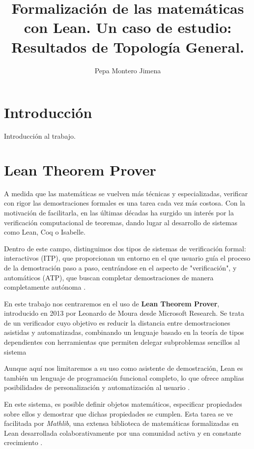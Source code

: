 \documentclass{article}
\title{Formalización de las matemáticas con Lean. Un caso de estudio: Resultados de Topología General.}
\author{Pepa Montero Jimena}
\date{}
\begin{document}
\maketitle
\tableofcontents


\section{Introducción}

Introducción al trabajo.



\newpage

\section{Lean Theorem Prover}

A medida que las matemáticas se vuelven más técnicas y especializadas, verificar con rigor las demostraciones formales es una tarea cada vez más costosa. Con la motivación de facilitarla, en las últimas décadas ha surgido un interés por la verificación computacional de teoremas, dando lugar al desarrollo de sistemas como Lean, Coq o Isabelle.

Dentro de este campo, distinguimos dos tipos de sistemas de verificación formal: interactivos (ITP), que proporcionan un entorno en el que usuario guía el proceso de la demostración paso a paso, centrándose en el aspecto de "verificación", y automáticos (ATP), que buscan completar demostraciones de manera completamente autónoma \cite[Sección~1]{avigad2024theorem}.

En este trabajo nos centraremos en el uso de \textbf{Lean Theorem Prover}, introducido en 2013 por Leonardo de Moura desde Microsoft Research. Se trata de un verificador cuyo objetivo es reducir la distancia entre demostraciones asistidas y automatizadas, combinando un lenguaje basado en la teoría de tipos dependientes con herramientas que permiten delegar subproblemas sencillos al sistema

Aunque aquí nos limitaremos a su uso como asistente de demostración, Lean es también un lenguaje de programación funcional completo, lo que ofrece amplias posibilidades de personalización y automatización al usuario \cite[Sección~1]{avigad2024theorem}.

En este sistema, es posible definir objetos matemáticos, especificar propiedades sobre ellos y demostrar que dichas propiedades se cumplen. Esta tarea se ve facilitada por \textit{Mathlib}, una extensa biblioteca de matemáticas formalizadas en Lean desarrollada colaborativamente por una comunidad activa y en constante crecimiento \cite{mathlib}.
\end{document}
